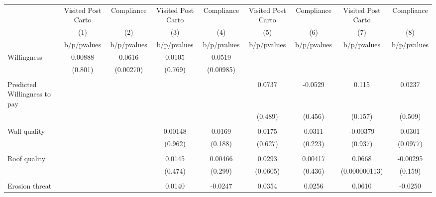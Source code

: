 {
\def\sym#1{\ifmmode^{#1}\else\(^{#1}\)\fi}
\begin{tabular}{l*{8}{c}}
\toprule
                &\multicolumn{1}{c}{Visited Post Carto}&\multicolumn{1}{c}{Compliance}&\multicolumn{1}{c}{Visited Post Carto}&\multicolumn{1}{c}{Compliance}&\multicolumn{1}{c}{Visited Post Carto}&\multicolumn{1}{c}{Compliance}&\multicolumn{1}{c}{Visited Post Carto}&\multicolumn{1}{c}{Compliance}\\
                &\multicolumn{1}{c}{(1)}&\multicolumn{1}{c}{(2)}&\multicolumn{1}{c}{(3)}&\multicolumn{1}{c}{(4)}&\multicolumn{1}{c}{(5)}&\multicolumn{1}{c}{(6)}&\multicolumn{1}{c}{(7)}&\multicolumn{1}{c}{(8)}\\
                &b/p/pvalues&b/p/pvalues&b/p/pvalues&b/p/pvalues&b/p/pvalues&b/p/pvalues&b/p/pvalues&b/p/pvalues\\
\midrule
Willingness     &  0.00888&   0.0616&   0.0105&   0.0519&         &         &         &         \\
                &  (0.801)&(0.00270)&  (0.769)&(0.00985)&         &         &         &         \\
                &         &         &         &         &         &         &         &         \\
Predicted Willingness to pay&         &         &         &         &   0.0737&  -0.0529&    0.115&   0.0237\\
                &         &         &         &         &  (0.489)&  (0.456)&  (0.157)&  (0.509)\\
                &         &         &         &         &         &         &         &         \\
Wall quality    &         &         &  0.00148&   0.0169&   0.0175&   0.0311& -0.00379&   0.0301\\
                &         &         &  (0.962)&  (0.188)&  (0.627)&  (0.223)&  (0.937)& (0.0977)\\
                &         &         &         &         &         &         &         &         \\
Roof quality    &         &         &   0.0145&  0.00466&   0.0293&  0.00417&   0.0668& -0.00295\\
                &         &         &  (0.474)&  (0.299)& (0.0605)&  (0.436)&(0.000000113)&  (0.159)\\
                &         &         &         &         &         &         &         &         \\
Erosion threat  &         &         &   0.0140&  -0.0247&   0.0354&   0.0256&   0.0610&  -0.0250\\

\end{tabular}}
